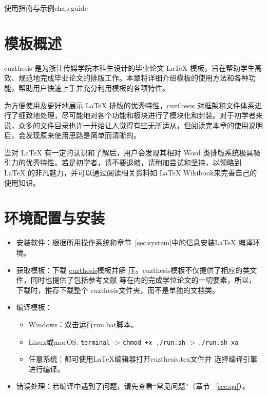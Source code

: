 \begin{cuzchapter}{使用指南与示例}{chap:guide}


	\section{模板概述}\label{sec:overview}

	cuzthesis 是为浙江传媒学院本科生设计的毕业论文 LaTeX 模板，旨在帮助学生高效、规范地完成毕业论文的排版工作。本章将详细介绍模板的使用方法和各种功能，帮助用户快速上手并充分利用模板的各项特性。

	为方便使用及更好地展示 LaTeX 排版的优秀特性，cuzthesis 对框架和文件体系进行了细致地处理，尽可能地对各个功能和板块进行了模块化和封装。对于初学者来说，众多的文件目录也许一开始让人觉得有些无所适从，但阅读完本章的使用说明后，会发现原来使用思路是简单而清晰的。

	当对 LaTeX 有一定的认识和了解后，用户会发现其相对 Word 类排版系统极具吸引力的优秀特性。若是初学者，请不要退缩，请稍加尝试和坚持，以领略到 LaTeX 的非凡魅力，并可以通过阅读相关资料如 LaTeX Wikibook\citep{wikibook2014latex}来完善自己的使用知识。

	\section{环境配置与安装}\label{sec:installation}

	\begin{itemize}
		\item 安装软件：根据所用操作系统和章节~\ref{sec:system}中的信息安装\LaTeX{}
		      编译环境。
		\item 获取模板：下载
		      \href{https://github.com/xiehao/CUZThesis}{cuzthesis}模板并解
		      压。cuzthesis模板不仅提供了相应的类文件，同时也提供了包括参考文献
		      等在内的完成学位论文的一切要素，所以，下载时，推荐下载整个
		      cuzthesis文件夹，而不是单独的文档类。
		\item 编译模板：
		      \begin{itemize}
			      \item Windows：双击运行run.bat脚本。
			      \item Linux或macOS: {\small \verb|terminal| -> \verb|chmod +x ./run.sh| -> \verb|./run.sh xa|}
			      \item 任意系统：都可使用\LaTeX{}编辑器打开cuzthesis.tex文件并
			            选择编译引擎进行编译。
		      \end{itemize}
		\item 错误处理：若编译中遇到了问题，请先查看“常见问题”（章节
		      ~\ref{sec:qa}）。
	\end{itemize}


\end{cuzchapter}
